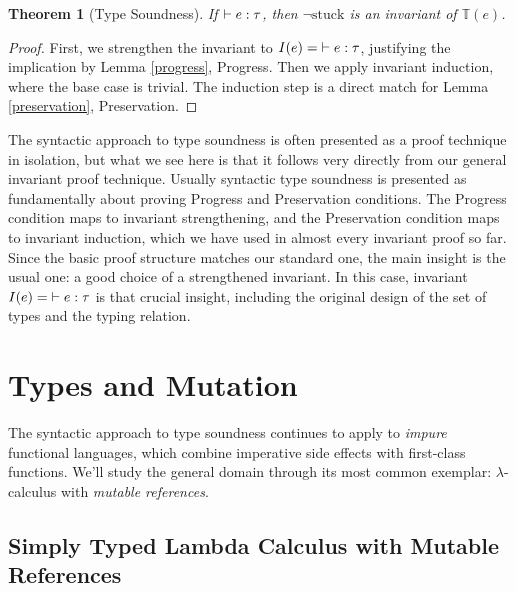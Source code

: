 \documentclass{amsbook}
\newtheorem{theorem}{Theorem}[chapter]
\theoremstyle{definition}
\theoremstyle{remark}
\numberwithin{section}{chapter}
\numberwithin{equation}{chapter}
\begin{document}
\invariants
\begin{theorem}[Type Soundness]
  If $\vdash e : \tau$, then $\neg \textrm{stuck}$ is an invariant of $\mathbb T(e)$.
\end{theorem}
\begin{proof}
  First, we strengthen the invariant to $I(e) = \; \vdash e : \tau$, justifying the implication by Lemma \ref{progress}, Progress.
  Then we apply invariant induction, where the base case is trivial.
  The induction step is a direct match for Lemma \ref{preservation}, Preservation.
\end{proof}

The syntactic approach to type soundness is often presented as a proof technique in isolation, but what we see here is that it follows very directly from our general invariant proof technique.
Usually syntactic type soundness is presented as fundamentally about proving Progress and Preservation conditions.
The Progress condition maps to invariant strengthening, and the Preservation condition maps to invariant induction, which we have used in almost every invariant proof so far.
Since the basic proof structure matches our standard one, the main insight is the usual one: a good choice of a strengthened invariant.
In this case, invariant $I(e) = \; \vdash e : \tau$ is that crucial insight, including the original design of the set of types and the typing relation.



\chapter{Types and Mutation}

The syntactic approach to type soundness continues to apply to \emph{impure} functional languages, which combine imperative side effects with first-class functions.
We'll study the general domain through its most common exemplar: $\lambda$-calculus with \emph{mutable references}.

\section{Simply Typed Lambda Calculus with Mutable References}

\newcommand{\newref}[1]{\mathsf{new}(#1)}
\newcommand{\readref}[1]{!#1}
\newcommand{\writeref}[2]{#1 := #2}
\end{document}
